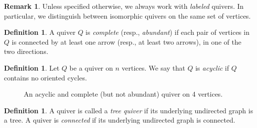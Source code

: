 \documentclass[11pt, letterpaper]{amsart}
\theoremstyle{definition}
\newtheorem{remark}[theorem]{Remark}
\newtheorem{definition}[theorem]{Definition}
\numberwithin{equation}{section}
\begin{document}
\begin{remark} 
\label{rem:labeled-quivers}
Unless specified otherwise, we always work with \emph{labeled} quivers. 
In particular, we distinguish between isomorphic quivers on the same set of vertices. 
\end{remark}
 
\begin{definition} 
\label{def:complete}
A quiver $Q$ is \emph{complete} (resp., \emph{abundant}) if each pair of vertices in $Q$ is connected by at least one arrow (resp., at least two arrows), in one of the two directions. %
\end{definition}

\begin{definition}
\label{def:acyclic}
Let $Q$ be a quiver on $n$ vertices. We say that $Q$ is \emph{acyclic} if $Q$ contains no oriented cycles. 
\end{definition}

\begin{figure}[ht]
\caption{An acyclic and complete (but not abundant) quiver on 4 vertices.}
\label{fig:quiver-example}
\end{figure}

\vspace{-0.3cm}

\begin{definition}
\label{def:tree quiv}
A quiver is called a \emph{tree quiver} if its underlying undirected graph is a tree. 
A quiver is \emph{connected} if its underlying undirected graph is connected. 
\end{definition}
\end{document}
